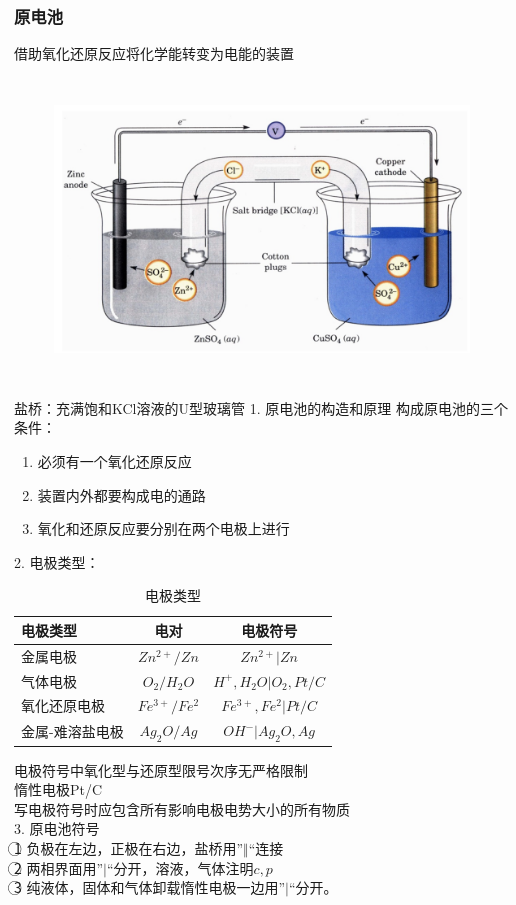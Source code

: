 \documentclass[utf8,a4paper,12pt]{ctexart}
\begin{document}
\subsubsection{原电池}
借助氧化还原反应将化学能转变为电能的装置\\
\begin{figure}[H]
\centering
\includegraphics[width=11cm,height=8cm]{battery.png}
\end{figure}
盐桥：充满饱和KCl溶液的U型玻璃管
1. 原电池的构造和原理
构成原电池的三个条件：
\begin{enumerate}[(1)]
\item 必须有一个氧化还原反应
\item 装置内外都要构成电的通路
\item 氧化和还原反应要分别在两个电极上进行
\end{enumerate}
2. 电极类型：\\
\begin{table}[h]
\centering
\begin{tabular}{l|c|c}
\toprule
电极类型& 电对 & 电极符号\\
\hline
金属电极& $Zn^{2+}/Zn$   & $Zn^{2+}\vert Zn$\\
气体电极& $O_{2}/H_{2}O$ & $H^{+}, H_{2}O\vert O_{2}, Pt/C$\\
氧化还原电极& $Fe^{3+}/Fe^{2}$ & $Fe^{3+}, Fe^{2}\vert Pt/C$\\
金属-难溶盐电极& $Ag_{2}O/Ag$ & $OH^{-}\vert Ag_{2}O, Ag$\\
\bottomrule
\end{tabular}
\caption{电极类型}
\end{table}
电极符号中氧化型与还原型限号次序无严格限制\\
惰性电极Pt/C\\
写电极符号时应包含所有影响电极电势大小的所有物质\\
3. 原电池符号\\
\textcircled{1} 负极在左边，正极在右边，盐桥用”$\Vert$“连接 \\
\textcircled{2} 两相界面用”$\vert$“分开，溶液，气体注明$c,p$\\
\textcircled{3} 纯液体，固体和气体卸载惰性电极一边用”$\vert$“分开。\\
\end{document}
